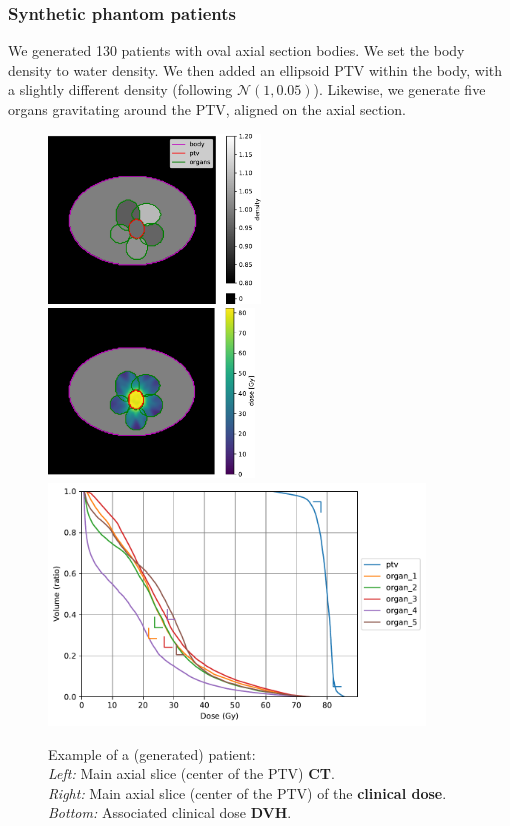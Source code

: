 \subsubsection*{Synthetic phantom patients}
We generated 130 patients with oval axial section bodies.
We set the body density to water density.
We then added an ellipsoid PTV within the body, with a slightly different density (following $\mathcal{N}(1,0.05)$).
Likewise, we generate five organs gravitating around the PTV, aligned on the axial section.

\begin{figure}
	\centering
	\label{fig:main_slice-ct}	\includegraphics[height=4.5cm]{main_slice-ct.pdf}
	\hspace{0.5cm}
	\label{fig:main_slice-dose}
	\includegraphics[height=4.5cm]{main_slice-dose.pdf}
	\\
	\label{fig:clinical_dvh}
	\includegraphics[width=10cm]{dvh_example.pdf}
	\caption{
		Example of a (generated) patient: \\
		\textit{Left:} Main axial slice (center of the PTV) \textbf{CT}.\\
		\textit{Right:} Main axial slice (center of the PTV) of the \textbf{clinical dose}. \\
		\textit{Bottom:} Associated clinical dose \textbf{DVH}.
	}
	
\end{figure}

